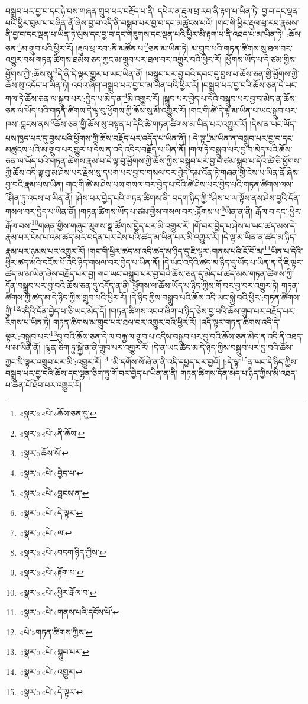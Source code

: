 བསྒྲུབ་པར་བྱ་བ་དང་ཉེ་བས་གཞན་གྲུབ་པར་བརྗོད་པ་ནི། དཔེར་ན་རྡུལ་ཕྲ་རབ་ནི་རྟག་པ་ཡིན་ཏེ། བྱ་བ་དང་ལྡན་པའི་ཕྱིར་བུམ་པ་བཞིན་ནོ་ཞེས་བྱ་བ་འདི་ནི་བསྒྲུབ་པར་བྱ་བ་དང་མཚུངས་པའོ། །གང་གི་ཕྱིར་རྡུལ་ཕྲ་རབ་རྣམས་ནི་བྱ་བ་དང་ལྡན་པ་ཡིན་ཏེ་ལུས་དང་བྱ་བ་དང་གཟུགས་དང་ལྡན་པའི་ཕྱིར་མི་རྟག་པ་ནི་འཐད་པ་མ་ཡིན་ཏེ། :ཆོས་ཅན་\footnote{«སྣར་»«པེ་»ཆོས་ཅན་དུ་}མ་གྲུབ་པའི་ཕྱིར་རོ། །རྡུལ་ཕྲ་རབ་:ནི་མཚོན་པ་\footnote{«སྣར་»«པེ་»ནི་ཆོས་}ཅན་མ་ཡིན་ཏེ། མ་གྲུབ་པའི་གཏན་ཚིགས་སུ་ཐལ་བར་འགྱུར་བས་གཏན་ཚིགས་ཐམས་ཅད་ཀྱང་མ་གྲུབ་པར་ཐལ་བར་འགྱུར་བའི་ཕྱིར་རོ། །ཕྱོགས་ཡོད་པ་དེ་ཙམ་གྱིས་ཕྱོགས་ཀྱི་:ཆོས་སུ་\footnote{«སྣར་»ཆོས་སོ་}དེ་ནི་དེ་ལྟར་གྱུར་པ་ཡང་ཡིན་ནོ། །བསྒྲུབ་པར་བྱ་བའི་དབང་དུ་བྱས་པ་ཆོས་ཅན་གྱི་ཕྱོགས་ཀྱི་ཆོས་སུ་འདོད་པ་ཡིན་ཏེ། འབའ་ཞིག་བསྒྲུབ་པར་བྱ་བ་མ་ཡིན་པའི་ཕྱིར་རོ། །བསྒྲུབ་པར་བྱ་བའི་ཆོས་ཅན་དེ་ཡང་གལ་ཏེ་ཆོས་ཅན་ལ་སྒྲུབ་པར་:བྱེད་པ་མེད་ན་\footnote{«སྣར་»«པེ་»བྱེད་པ་}མི་འགྱུར་རོ། །སྒྲུབ་པར་བྱེད་པ་དེའི་བསྒྲུབ་པར་བྱ་བ་མེད་ན་ཆོས་ཅན་ལ་ཡོད་པའི་གཏན་ཚིགས་དེ་ལྟ་བུ་ཕྱོགས་ཀྱི་ཆོས་སུ་མི་འགྱུར་རོ། །གང་གི་ཚེ་དེ་ལྟ་མ་ཡིན་པ་ཡང་སྒྲུབ་པར་ཁས་:བླངས་ནས་\footnote{«སྣར་»«པེ་»བླངས་ན་}ཆོས་ཅན་གྱི་ཆོས་སུ་བསྟན་པ་དེའི་ཚེ་གཏན་ཚིགས་མ་ཡིན་པར་འགྱུར་རོ། །དེས་ན་ཡང་ཡོད་པས་ཁྱད་པར་དུ་བྱས་པའི་ཕྱོགས་ཀྱི་ཆོས་བརྗོད་པར་འདོད་པ་ཡིན་ནོ། །:དེ་ལྟ་\footnote{«སྣར་»«པེ་»དེ་ལྟར་}མ་ཡིན་ན་བསྒྲུབ་པར་བྱ་བ་དང་མཚུངས་པའི་མ་གྲུབ་པར་གྱུར་པ་དེས་ན་འདི་འདིར་བརྗོད་པ་ཡིན་ནོ། །གལ་ཏེ་བསྒྲུབ་པར་བྱ་བ་མེད་པའི་ཆོས་ཅན་ལ་ཡོད་པའི་གཏན་ཚིགས་རྣམ་པ་དེ་ལྟ་བུ་ཕྱོགས་ཀྱི་ཆོས་ཀྱིས་བསྒྲུབ་པར་བྱ་བ་ཙམ་སྒྲུབ་པ་དེའི་ཚེ་ཅི་ཕྱོགས་ཀྱི་ཆོས་འདི་ལྟ་བུ་མ་ཤེས་པར་རྗེས་སུ་དཔག་པར་བྱ་བ་གསལ་བར་བྱེད་དམ་འོན་ཏེ་གཞན་གྱི་ངེས་པ་ཡིན་ནོ་ཞེས་བྱ་བའི་རྣམ་པས་ཡིན། གང་གི་ཚེ་མ་ཤེས་པས་གསལ་བར་བྱེད་པ་དེའི་ཚེ་ཤེས་པར་བྱེད་པའི་གཏན་ཚིགས་ལས་\footnote{«སྣར་»«པེ་»ལ་}ཤིན་ཏུ་འདས་པ་ཡིན་ནོ། །ཤེས་པར་བྱེད་པའི་གཏན་ཚིགས་ནི་:བདག་ཉིད་ཀྱི་\footnote{«སྣར་»«པེ་»བདག་ཉིད་ཀྱིས་}ཤེས་པ་ལ་ལྟོས་ནས་ཤེས་བྱའི་དོན་གསལ་བར་བྱེད་པ་ཡིན་ནོ། །གཏན་ཚིགས་ཡོད་པ་ཙམ་གྱིས་གསལ་བར་:རྟོགས་པ་\footnote{«སྣར་»«པེ་»རྟོག་པ་}ཡིན་ན་ནི། རྒོལ་བ་དང་:ཕྱིར་རྒོལ་བས་\footnote{«སྣར་»«པེ་»ཕྱིར་རྒོལ་བ་}གཞན་གྱིས་གཞུང་ལུགས་སྣ་ཚོགས་བྱེད་པར་མི་འགྱུར་རོ། །གོ་བར་བྱེད་པ་ཤེས་པ་ཡང་ཚད་མས་དེ་རྣམ་པར་ངེས་པ་འམ་ཚད་མར་བདེན་པར་ངེས་པའི་ཚད་མ་ཡིན་པར་མི་འགྱུར་རོ། །དེ་ལྟ་མ་ཡིན་ན་ཚད་མ་ཉིད་རྣམ་པར་ཉམས་པར་འགྱུར་རོ། །གང་གི་ཕྱིར་ཚད་མ་འདི་ཚད་མ་ཉིད་དུ་ཇི་ལྟར་:གནས་པའི་ངོ་བོ་མ་\footnote{«སྣར་»«པེ་»གནས་པའི་དངོས་པོ་}ཡིན་པ་དེའི་ཕྱིར་ཚད་མའི་དངོས་པོ་འདི་ཉིད་གསལ་བར་བྱེད་པ་ཡིན་ནོ། །དེ་ཡང་འདིའི་ཚད་མ་ཉིད་དུ་ཡོད་པ་ཡིན་ན་དེ་ཇི་ལྟར་ཚད་མ་མ་ཡིན་ཞེས་བརྗོད་པར་བྱ། གང་ཡང་བསྒྲུབ་པར་བྱ་བའི་ཆོས་ཅན་དུ་མེད་པ་ཚད་མས་གཏན་ཚིགས་ཀྱི་དོན་བསྒྲུབ་པར་བྱ་བའི་ཆོས་ཅན་དུ་འདོད་ན་ནི། ཕྱོགས་ལ་ཆོས་ཡོད་པ་ཉིད་ཀྱིས་གོ་བར་བྱ་བར་འགྱུར་ཏེ། གཏན་ཚིགས་ཀྱི་ཚད་མ་དེ་ཉིད་ཀྱིས་གྲུབ་པའི་ཕྱིར་རོ། །དེ་ཉིད་ཀྱིས་བསྒྲུབ་པའི་ཆོས་འདི་ཡང་སྐྱེ་བའི་ཕྱིར་:གཏན་ཚིགས་ཀྱི་\footnote{«པེ་»གཏན་ཚིགས་ཀྱིས་}འདིའི་དོན་བྱེད་པ་ཅི་ཡང་མེད་དོ། །གཏན་ཚིགས་འབའ་ཞིག་པ་ཉིད་ཅེས་བྱ་བའི་ཆོས་གྲུབ་པར་བརྗོད་པར་རིགས་པ་ཡིན་ཏེ། གཏན་ཚིགས་མ་གྲུབ་པར་ཐལ་བར་འགྱུར་བའི་ཕྱིར་རོ། །འདི་ལྟར་གཏན་ཚིགས་འདི་དེ་ལྟར་:བསྒྲུབ་པར་\footnote{«སྣར་»«པེ་»སྒྲུབ་པར་}བྱ་བའི་ཆོས་ཅན་དེ་ལ་བརྒྱ་ལ་གྲུབ་པ་འདིས་བསྒྲུབ་པར་བྱ་བའི་ཆོས་ཅན་མེད་ན་འདི་ནི་འཐད་པ་མ་ཡིན་ནོ། །ལྷན་ཅིག་ཏུ་སྐྱེ་ན་ནི་གྲུབ་པར་འགྱུར་རོ། །དེ་ན་ཡང་ཚད་མ་དེ་ཉིད་ཀྱིས་བསྒྲུབ་པར་བྱ་བའི་ཆོས་ཀྱང་ཇི་ལྟར་འགྲུབ་པར་མི་:འགྱུར་རོ།\footnote{«སྣར་»«པེ་»འགྱུར།} །མི་དགོས་སོ་ཞེ་ན་ནི་འདི་དཔྱད་པར་བྱའོ། །:དེ་ལྟ་\footnote{«སྣར་»«པེ་»དེ་ལྟར་}ན་ཡང་དེ་ཉིད་ཀྱིས་བསྒྲུབ་པར་བྱ་བའི་ཆོས་དང་ལྷན་ཅིག་ཏུ་གོ་བར་བྱེད་པ་ཡིན་ན་ནི། གཏན་ཚིགས་དོན་མེད་པ་ཉིད་ཀྱིས་མི་འཐད་པ་ཆེན་པོ་ཐོབ་པར་འགྱུར་རོ། 